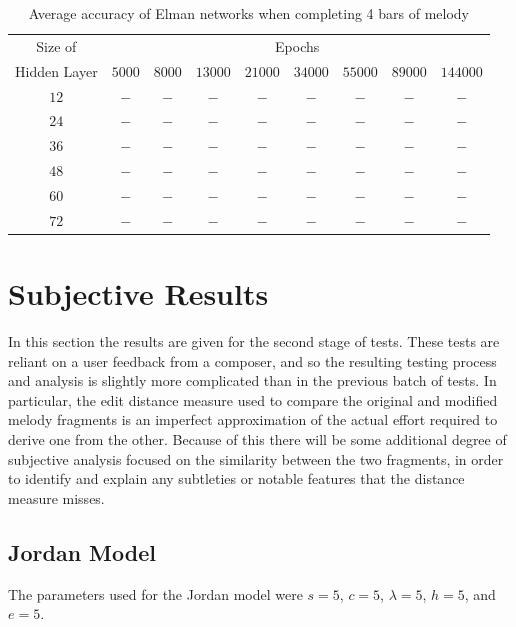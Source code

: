 \documentclass[ author={Stephen Livermore-Tozer},
				supervisor={Dr. Peter Flach},
				degree={MEng},
				title={Algorithmic Co-composition Using Machine Learning},
				subtitle={},
				type={research},
				year={2016} ]{dissertation}
\begin{document}
	\begin{table}[htp]
		\begin{center}
			\begin{tabular}{ccccccccc}
				\toprule
				Size of& \multicolumn{8}{c}{Epochs}\\
				\cline{2-9}
				Hidden Layer& $5000$ & $8000$ & $13000$ & $21000$ & $34000$ & $55000$ & $89000$ & $144000$\\
				\hline
				$12$ & $-$ & $-$ & $-$ & $-$ & $-$ & $-$ & $-$ & $-$\\
				$24$ & $-$ & $-$ & $-$ & $-$ & $-$ & $-$ & $-$ & $-$\\
				$36$ & $-$ & $-$ & $-$ & $-$ & $-$ & $-$ & $-$ & $-$\\
				$48$ & $-$ & $-$ & $-$ & $-$ & $-$ & $-$ & $-$ & $-$\\
				$60$ & $-$ & $-$ & $-$ & $-$ & $-$ & $-$ & $-$ & $-$\\
				$72$ & $-$ & $-$ & $-$ & $-$ & $-$ & $-$ & $-$ & $-$\\
				\bottomrule
			\end{tabular}
		\end{center}
		\caption{Average accuracy of Elman networks when completing 4 bars of melody}
		\label{tab:elman-4-bar-results}
	\end{table}
	
	\section{Subjective Results}
	
	In this section the results are given for the second stage of tests. These tests are reliant on a user feedback from a composer, and so the resulting testing process and analysis is slightly more complicated than in the previous batch of tests. In particular, the edit distance measure used to compare the original and modified melody fragments is an imperfect approximation of the actual effort required to derive one from the other. Because of this there will be some additional degree of subjective analysis focused on the similarity between the two fragments, in order to identify and explain any subtleties or notable features that the distance measure misses. 
	
	\subsection{Jordan Model}
	
	The parameters used for the Jordan model were $s = 5$, $c = 5$, $\lambda = 5$, $h = 5$, and $e = 5$. 
	
\end{document}

